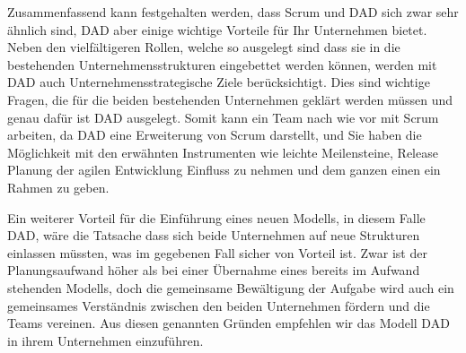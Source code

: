 Zusammenfassend kann festgehalten werden, dass Scrum und DAD sich zwar sehr ähnlich sind, DAD aber einige wichtige Vorteile für Ihr Unternehmen bietet. Neben den vielfältigeren Rollen, welche so ausgelegt sind dass sie in die bestehenden Unternehmensstrukturen eingebettet werden können, werden mit DAD auch Unternehmensstrategische Ziele berücksichtigt. Dies sind wichtige Fragen, die für die beiden bestehenden Unternehmen geklärt werden müssen und genau dafür ist DAD ausgelegt. Somit kann ein Team nach wie vor mit Scrum arbeiten, da DAD eine Erweiterung von Scrum darstellt,  und Sie haben die Möglichkeit mit den erwähnten Instrumenten wie leichte Meilensteine, Release Planung der agilen Entwicklung Einfluss zu nehmen und dem ganzen einen ein Rahmen zu geben.\newline

Ein weiterer Vorteil für die Einführung eines neuen Modells, in diesem Falle DAD, wäre die Tatsache dass sich beide Unternehmen auf neue Strukturen einlassen müssten, was im gegebenen Fall sicher von Vorteil ist. Zwar ist der Planungsaufwand höher als bei einer Übernahme eines bereits im Aufwand stehenden Modells, doch die gemeinsame Bewältigung der Aufgabe wird auch ein gemeinsames Verständnis zwischen den beiden Unternehmen fördern und die Teams vereinen. Aus diesen genannten Gründen empfehlen wir das Modell DAD in ihrem Unternehmen einzuführen.


	